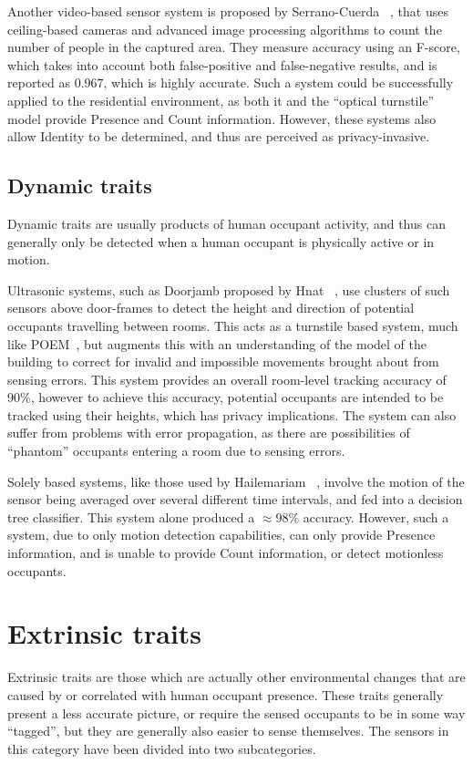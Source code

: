 \documentclass[../thesis/thesis.tex]{subfiles}
\begin{document}
Another video-based sensor system is proposed by Serrano-Cuerda \etal~\cite{serrano2013efficient}, that uses ceiling-based cameras and advanced image processing algorithms to count the number of people in the captured area. They measure accuracy using an F-score, which takes into account both false-positive and false-negative results, and is reported as 0.967, which is highly accurate. Such a system could be successfully applied to the residential environment, as both it and the ``optical turnstile'' model provide Presence and Count information. However, these systems also allow Identity to be determined, and thus are perceived as privacy-invasive.

\subsection{Dynamic traits}
\label{subsubsec:litreview:sensors:intrinsic:dynamic}
Dynamic traits are usually products of human occupant activity, and thus can generally only be detected when a human occupant is physically active or in motion.

Ultrasonic systems, such as Doorjamb proposed by Hnat \etal~\cite{hnat2012doorjamb}, use clusters of such sensors above door-frames to detect the height and direction of potential occupants travelling between rooms. This acts as a turnstile based system, much like POEM~\cite{erickson2013poem}, but augments this with an understanding of the model of the building to correct for invalid and impossible movements brought about from sensing errors. This system provides an overall room-level tracking accuracy of 90\%, however to achieve this accuracy, potential occupants are intended to be tracked using their heights, which has privacy implications. The system can also suffer from problems with error propagation, as there are possibilities of ``phantom'' occupants entering a room due to sensing errors.

Solely \pir based systems, like those used by Hailemariam \etal~\cite{hailemariam2011real}, involve the motion of the sensor being averaged over several different time intervals, and fed into a decision tree classifier. This \pir system alone produced a $\approx98\%$ accuracy. However, such a system, due to only motion detection capabilities, can only provide Presence information, and is unable to provide Count information, or detect motionless occupants.

\section{Extrinsic traits}
\label{subsec:litreview:sensors:extrinsic}
Extrinsic traits are those which are actually other environmental changes that are caused by or correlated with human occupant presence. These traits generally present a less accurate picture, or require the sensed occupants to be in some way ``tagged'', but they are generally also easier to sense themselves. The sensors in this category have been divided into two subcategories.
\end{document}
